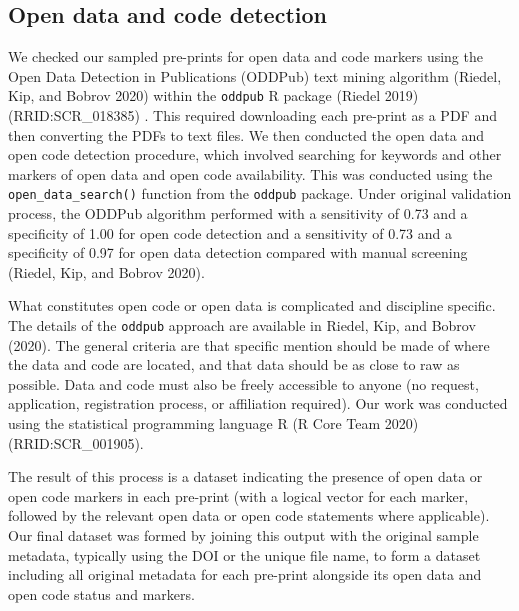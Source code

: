 \documentclass[
]{article}
\begin{document}
\hypertarget{open-data-and-code-detection}{%
\subsection{Open data and code detection}\label{open-data-and-code-detection}}

We checked our sampled pre-prints for open data and code markers using the Open Data Detection in Publications (ODDPub) text mining algorithm (Riedel, Kip, and Bobrov 2020) within the \texttt{oddpub} R package (Riedel 2019) (RRID:SCR\_018385) . This required downloading each pre-print as a PDF and then converting the PDFs to text files.
We then conducted the open data and open code detection procedure, which involved searching for keywords and other markers of open data and open code availability. This was conducted using the \texttt{open\_data\_search()} function from the \texttt{oddpub} package. Under original validation process, the ODDPub algorithm performed with a sensitivity of 0.73 and a specificity of 1.00 for open code detection and a sensitivity of 0.73 and a specificity of 0.97 for open data detection compared with manual screening (Riedel, Kip, and Bobrov 2020).

What constitutes open code or open data is complicated and discipline specific. The details of the \texttt{oddpub} approach are available in Riedel, Kip, and Bobrov (2020). The general criteria are that specific mention should be made of where the data and code are located, and that data should be as close to raw as possible. Data and code must also be freely accessible to anyone (no request, application, registration process, or affiliation required). Our work was conducted using the statistical programming language R (R Core Team 2020) (RRID:SCR\_001905).

The result of this process is a dataset indicating the presence of open data or open code markers in each pre-print (with a logical vector for each marker, followed by the relevant open data or open code statements where applicable). Our final dataset was formed by joining this output with the original sample metadata, typically using the DOI or the unique file name, to form a dataset including all original metadata for each pre-print alongside its open data and open code status and markers.
\end{document}
